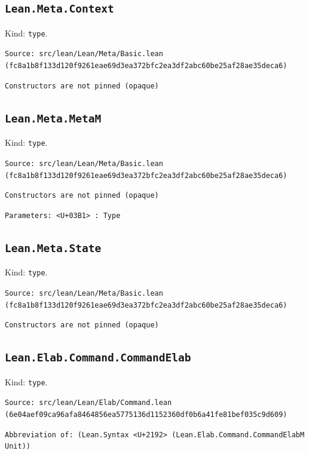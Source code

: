 \documentclass[11pt]{article}
\begin{document}
\subsection*{\texttt{Lean.Meta.Context}}
\noindent Kind: \texttt{type}.\par
\noindent \texttt{Source: src/lean/Lean/Meta/Basic.lean (fc8a1b8f133d120f9261eae69d3ea372bfc2ea3df2abc60be25af28ae35deca6)}\par
\noindent \texttt{Constructors are not pinned (opaque)}\par
\subsection*{\texttt{Lean.Meta.MetaM}}
\noindent Kind: \texttt{type}.\par
\noindent \texttt{Source: src/lean/Lean/Meta/Basic.lean (fc8a1b8f133d120f9261eae69d3ea372bfc2ea3df2abc60be25af28ae35deca6)}\par
\noindent \texttt{Constructors are not pinned (opaque)}\par
\noindent \texttt{Parameters: <U+03B1> : Type}\par
\subsection*{\texttt{Lean.Meta.State}}
\noindent Kind: \texttt{type}.\par
\noindent \texttt{Source: src/lean/Lean/Meta/Basic.lean (fc8a1b8f133d120f9261eae69d3ea372bfc2ea3df2abc60be25af28ae35deca6)}\par
\noindent \texttt{Constructors are not pinned (opaque)}\par
\subsection*{\texttt{Lean.Elab.Command.CommandElab}}
\noindent Kind: \texttt{type}.\par
\noindent \texttt{Source: src/lean/Lean/Elab/Command.lean (6e04aef09ca96afa8464856ea5775136d1152360df0b6a41fe81bef035c9d609)}\par
\noindent \texttt{Abbreviation of: (Lean.Syntax <U+2192> (Lean.Elab.Command.CommandElabM Unit))}\par
\end{document}
